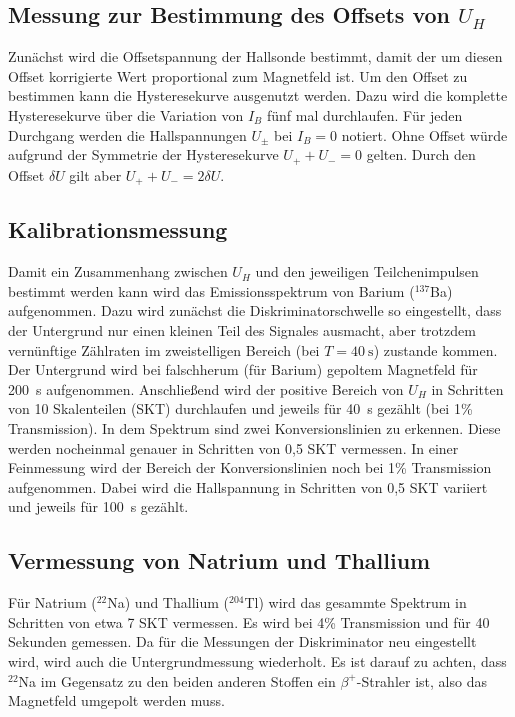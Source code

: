 \subsection{Messung zur Bestimmung des Offsets von $U_H$}
Zunächst wird die Offsetspannung der Hallsonde bestimmt, damit der um diesen Offset korrigierte Wert proportional zum Magnetfeld ist. Um den Offset zu bestimmen kann die Hysteresekurve ausgenutzt werden. Dazu wird die komplette Hysteresekurve über die Variation von $I_B$ fünf mal durchlaufen. Für jeden Durchgang werden die Hallspannungen $U_\pm$ bei $I_B=0$ notiert. Ohne Offset würde aufgrund der Symmetrie der Hysteresekurve $U_++U_-=0$ gelten. Durch den Offset $\delta U$ gilt aber $U_++U_-=2\delta U$. \\

\subsection{Kalibrationsmessung}
Damit ein Zusammenhang zwischen $U_H$ und den jeweiligen Teilchenimpulsen bestimmt werden kann wird das Emissionsspektrum von Barium ($^{137}$Ba) aufgenommen. Dazu wird zunächst die Diskriminatorschwelle so eingestellt, dass der Untergrund nur einen kleinen Teil des Signales ausmacht, aber trotzdem vernünftige Zählraten im zweistelligen Bereich (bei $T=\SI{40}{\second}$) zustande kommen. Der Untergrund wird bei falschherum (für Barium) gepoltem Magnetfeld für \SI{200}{\second} aufgenommen. Anschließend wird der positive Bereich von $U_H$ in Schritten von 10 Skalenteilen (SKT) durchlaufen und jeweils für \SI{40}{\second} gezählt (bei 1\% Transmission). In dem Spektrum sind zwei Konversionslinien zu erkennen. Diese werden nocheinmal genauer in Schritten von 0,5 SKT vermessen. In einer Feinmessung wird der Bereich der Konversionslinien noch bei 1\% Transmission aufgenommen. Dabei wird die Hallspannung in Schritten von  0,5 SKT variiert und jeweils für \SI{100}{\second} gezählt.

\subsection{Vermessung von Natrium und Thallium}
Für Natrium ($^{22}$Na) und Thallium ($^{204}$Tl) wird das gesammte Spektrum in Schritten von etwa 7 SKT vermessen. Es wird bei 4\% Transmission und für 40 Sekunden gemessen. Da für die Messungen der Diskriminator neu eingestellt wird, wird auch die Untergrundmessung wiederholt. Es ist darauf zu achten, dass $^{22}$Na im Gegensatz zu den beiden anderen Stoffen ein $\beta^+$-Strahler ist, also das Magnetfeld umgepolt werden muss.
